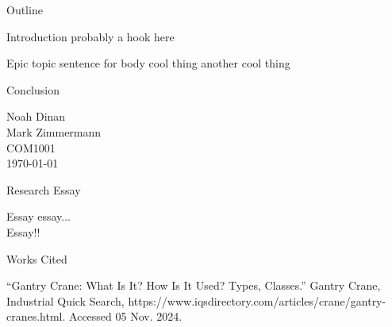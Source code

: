 \documentclass[12pt]{article}
\begin{document}
\begin{center}
Outline
\end{center}

\begin{outline}[enumerate]
\1 Introduction
    \2 probably a hook here

\1 Epic topic sentence for body
    \2 cool thing
    \2 another cool thing

\1 Conclusion

\end{outline}

\newpage

\noindent
Noah Dinan \\ Mark Zimmermann \\ COM1001 \\ \today \\

\begin{center}
Research Essay
\end{center}

\setlength{\parindent}{0.5in}

Essay essay...\\

Essay!!

\newpage

\begin{center}
Works Cited
\end{center}

\begin{hangparas}{0.5in}{1}

“Gantry Crane: What Is It? How Is It Used? Types, Classes.” Gantry Crane, Industrial Quick Search,
https://www.iqsdirectory.com/articles/crane/gantry-cranes.html. Accessed 05 Nov. 2024. 

\end{hangparas}
\end{document}
